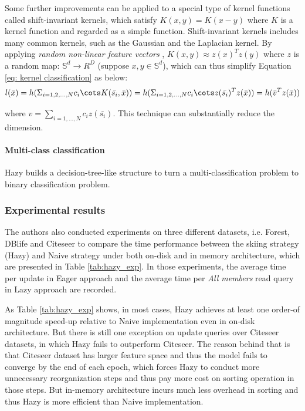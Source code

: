 Some further improvements can be applied to a special type of kernel functions called shift-invariant kernels, which satisfy $K(x, y) = K(x-y)$ where $K$ is a kernel function and regarded as a simple function. Shift-invariant kernels includes many common kernels, such as the Gaussian and the Laplacian kernel. By applying {\em random non-linear feature vectors} \cite{rahimi2008random}, $K(x, y) \approx z(x)^Tz(y)$ where $z$ is a random map: $\mathbb{S}^d \rightarrow R^D$ (suppose $x, y \in \mathbb{S}^d$), which can thus simplify Equation \ref{eq: kernel classification} as below:
\begin{equation}
    l(\bar{x})=h(\Sigma_{i=1,2,\dots,N}c_i\cots K(\bar{s_i}, \bar{x})) = h(\Sigma_{i=1,2,\dots,N}c_i\cots z(\bar{s_i})^T z(\bar{x}))=h(\bar{v}^T z(\bar{x}))
\end{equation}

where $v=\sum_{i=1,\dots,N}c_i z(\bar{s_i})$. This technique can substantially reduce the dimension.

\paragraph{Multi-class classification}
Hazy builds a decision-tree-like structure to turn a multi-classification problem to binary classification problem.

\subsubsection{Experimental results}
The authors also conducted experiments on three different datasets, i.e. Forest, DBlife and Citeseer to compare the time performance between the skiing strategy (Hazy) and Naive strategy under both on-disk and in memory architecture, which are presented in Table \ref{tab:hazy_exp}. In those experiments, the average time per update in Eager approach and the average time per {\em All members} read query in Lazy approach are recorded.

As Table \ref{tab:hazy_exp} shows, in most cases, Hazy achieves at least one order-of magnitude speed-up relative to Naive implementation even in on-disk architecture. But there is still one exception on update queries over Citeseer datasets, in which Hazy fails to outperform Citeseer. The reason behind that is that Citeseer dataset has larger feature space and thus the model fails to converge by the end of each epoch, which forces Hazy to conduct more unnecessary reorganization steps and thus pay more cost on sorting operation in those steps. But in-memory architecture incurs much less overhead in sorting and thus Hazy is more efficient than Naive implementation.


